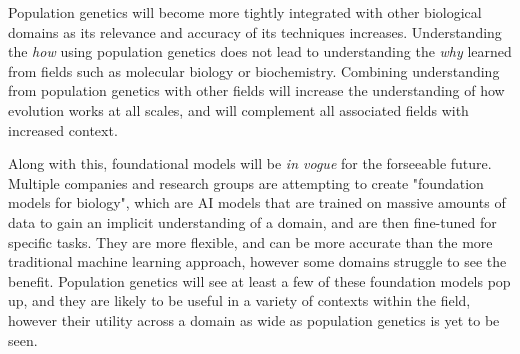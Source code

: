 Population genetics will become more tightly integrated with other biological domains as its relevance and accuracy of its techniques increases. Understanding the \textit{how} using population genetics does not lead to understanding the \textit{why} learned from fields such as molecular biology or biochemistry. Combining understanding from population genetics with other fields will increase the understanding of how evolution works at all scales, and will complement all associated fields with increased context.

Along with this, foundational models will be \textit{in vogue} for the forseeable future. Multiple companies and research groups are attempting to create "foundation models for biology", which are AI models that are trained on massive amounts of data to gain an implicit understanding of a domain, and are then fine-tuned for specific tasks. They are more flexible, and can be more accurate than the more traditional machine learning approach, however some domains struggle to see the benefit. Population genetics will see at least a few of these foundation models pop up, and they are likely to be useful in a variety of contexts within the field, however their utility across a domain as wide as population genetics is yet to be seen. 